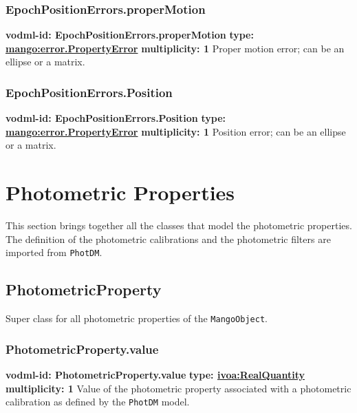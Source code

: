     \subsubsection{EpochPositionErrors.properMotion}
    \textbf{vodml-id: EpochPositionErrors.properMotion} \newline
    \textbf{type: \hyperref[sect:error.PropertyError]{mango:error.PropertyError}} \newline
    \textbf{multiplicity: 1} \newline
    Proper motion error; can be an ellipse or a matrix.

    \subsubsection{EpochPositionErrors.Position}
    \textbf{vodml-id: EpochPositionErrors.Position} \newline
    \textbf{type: \hyperref[sect:error.PropertyError]{mango:error.PropertyError}} \newline
    \textbf{multiplicity: 1} \newline
    Position error; can be an ellipse or a matrix.

\section{Photometric Properties}
This section brings together all the classes that model the photometric properties.
The definition of the photometric calibrations and the 
photometric filters are imported from \texttt{PhotDM}. 
  \subsection{PhotometricProperty}
    \label{sect:PhotometricProperty}
    Super class for all photometric properties of the \texttt{MangoObject}.

    \subsubsection{PhotometricProperty.value}
    \textbf{vodml-id: PhotometricProperty.value} \newline
    \textbf{type: \hyperref[sect:ivoa]{ivoa:RealQuantity}} \newline
    \textbf{multiplicity: 1} \newline
    Value of the photometric property associated with a photometric calibration as defined by the \texttt{PhotDM} model.

